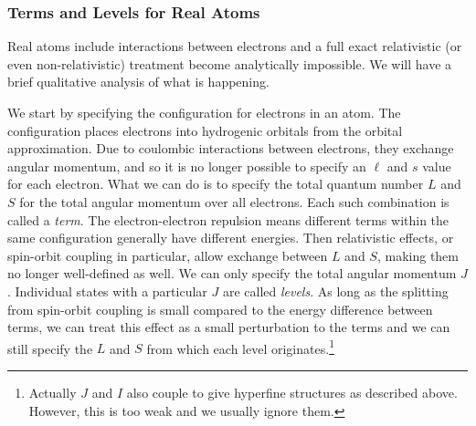 \documentclass{article}
\theoremstyle{plain}\theoremheaderfont{\normalfont\itshape}\theorembodyfont{\rmfamily}\theoremseparator{.}\newtheorem*{rem}{Remark}\newtheorem*{ex}{Example}\newtheorem*{proof}{Proof}\newtheorem*{altp}{Alternative proof}
\theoremstyle{plain}\theoremheaderfont{\normalfont\bfseries}\theorembodyfont{\rmfamily}\theoremseparator{.}\newtheorem{thm}{Theorem}[section]\newtheorem{lem}[thm]{Lemma}\newtheorem{prop}[thm]{Proposition}\newtheorem*{cor}{Corollary}\newtheorem{defn}[thm]{Definition}\newtheorem{clm}[thm]{Claim}\newtheorem{clminproof}{Claim}
\theoremstyle{break}\theoremheaderfont{\normalfont\itshape}\theorembodyfont{\rmfamily}\theoremseparator{.\medskip}\newtheorem*{proofskip}{Proof}\newtheorem*{exs}{Examples}\newtheorem*{rems}{Remarks}
\theoremstyle{break}\theoremheaderfont{\normalfont\bfseries}\theorembodyfont{\rmfamily}\theoremseparator{.\medskip}\newtheorem{lemskip}[thm]{Lemma}\newtheorem{defnskip}[thm]{Definition}\newtheorem{propskip}[thm]{Proposition}\newtheorem{thmskip}[thm]{Theorem}
\numberwithin{equation}{section}
\begin{document}
    \subsubsection{Terms and Levels for Real Atoms}
    Real atoms include interactions between electrons and a full exact relativistic (or even non-relativistic) treatment become analytically impossible. We will have a brief qualitative analysis of what is happening.

    We start by specifying the configuration for electrons in an atom. The configuration places electrons into hydrogenic orbitals from the orbital approximation. Due to coulombic interactions between electrons, they exchange angular momentum, and so it is no longer possible to specify an \(\ell\) and \(s\) value for each electron. What we can do is to specify the total quantum number \(L\) and \(S\) for the total angular momentum over all electrons. Each such combination is called a \textit{term}. The electron-electron repulsion means different terms within the same configuration generally have different energies. Then relativistic effects, or spin-orbit coupling in particular, allow exchange between \(L\) and \(S\), making them no longer well-defined as well. We can only specify the total angular momentum \(J\). Individual states with a particular \(J\) are called \textit{levels}. As long as the splitting from spin-orbit coupling is small compared to the energy difference between terms, we can treat this effect as a small perturbation to the terms and we can still specify the \(L\) and \(S\) from which each level originates.\footnote{Actually \(J\) and \(I\) also couple to give hyperfine structures as described above. However, this is too weak and we usually ignore them.}
\end{document}
